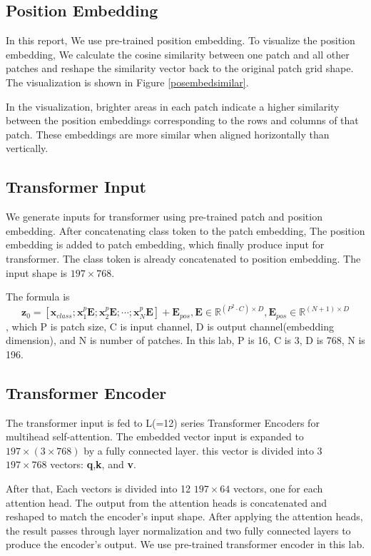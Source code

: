 \documentclass[extendedabs]{bmvc2k}
\begin{document}
\subsection{Position Embedding}
In this report, We use pre-trained position embedding. To visualize the position embedding, We calculate the cosine similarity between one patch and all other patches and reshape the similarity vector back to the original patch grid shape. The visualization is shown in Figure \ref{posembedsimilar}. 

In the visualization, brighter areas in each patch indicate a higher similarity between the position embeddings corresponding to the rows and columns of that patch. These embeddings are more similar when aligned horizontally than vertically.
\subsection{Transformer Input}
We generate inputs for transformer using pre-trained patch and position embedding. After concatenating class token to the patch embedding, The position embedding is added to patch embedding, which finally produce input for transformer. The class token is already concatenated to position embedding. The input shape is $197\times768$.

The formula is
$$
\textbf{z}_0 = [\textbf{x}_{class};\textbf{x}_1^p\textbf{E};\textbf{x}_2^p\textbf{E};\cdots;\textbf{x}_N^p\textbf{E}]+\textbf{E}_{pos},
\textbf{E}\in \mathbb{R}^{(P^2\cdot C)\times D}, \textbf{E}_{pos} \in \mathbb{R}^{(N+1)\times D} 
$$
, which P is patch size, C is input channel, D is output channel(embedding dimension), and N is number of patches. In this lab, P is 16, C is 3, D is 768, N is 196.

\subsection{Transformer Encoder}
The transformer input is fed to L(=12) series Transformer Encoders for multihead self-attention. The embedded vector input is expanded to $197\times(3\times768)$ by a fully connected layer. this vector is divided into 3 $197\times768$ vectors: \textbf{q},\textbf{k}, and \textbf{v}. 

After that, Each vectors is divided into 12 $197\times64$ vectors, one for each attention head.
The output from the attention heads is concatenated and reshaped to match the encoder's input shape. After applying the attention heads, the result passes through layer normalization and two fully connected  layers to produce the encoder's output. We use pre-trained transformer encoder in this lab.
\end{document}
